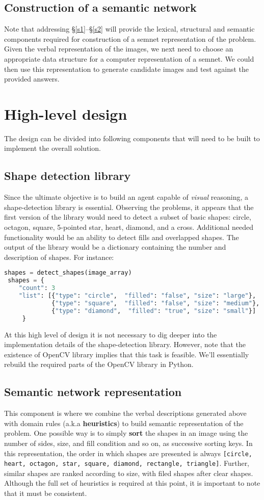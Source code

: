 \documentclass[10pt,letterpaper]{article}
\begin{document}
\subsection{Construction of a semantic network}
Note that addressing \S\ref{s1}--\S\ref{s2} will provide the lexical, structural and semantic components required for construction of a semnet representation of the problem. Given the verbal representation of the images, we next need to choose an appropriate data structure for a computer representation of a semnet. We could then use this representation to generate candidate images and test against the provided answers. 
\section{High-level design}
The design can be divided into following components that will need to be built to implement the overall solution.  
\subsection{Shape detection library}
Since the ultimate objective is to build an agent capable of {\em visual} reasoning, a shape-detection library is essential. Observing the problems, it appears that the first version of the library would need to detect a subset of basic shapes: circle, octagon, square, 5-pointed star, heart, diamond, and a cross. Additional needed functionality would be an ability to detect fills and overlapped shapes. The output of the library would be a dictionary containing the number and description of shapes. For instance:
\begin{small}
\begin{lstlisting}[language=python]
 shapes = detect_shapes(image_array)
 shapes = {
	"count": 3
	"list": [{"type": "circle",  "filled": "false", "size": "large"},
	         {"type": "square",  "filled": "false", "size": "medium"},
	         {"type": "diamond",  "filled": "true", "size": "small"}]
	 } 
\end{lstlisting}
\end{small}
At this high level of design it is not necessary to dig deeper into the implementation details of the shape-detection library. However, note that the existence of OpenCV library implies that this task is feasible. We'll essentially rebuild the required parts of the OpenCV library in Python. 
\subsection{Semantic network representation}
This component is where we combine the verbal descriptions generated above with domain rules (a.k.a {\bf heuristics}) to build semantic representation of the problem. One possible way is to simply {\bf sort} the shapes in an image using the number of sides, size, and fill condition and so on, as successive sorting keys. In this representation, the order in which shapes are presented is always {\tt[circle, heart, octagon, star, square, diamond, rectangle, triangle]}. Further, similar shapes are ranked according to size, with filed shapes after clear shapes.  Although the full set of heuristics is required at this point, it is important to note that it must be consistent.
\end{document}
